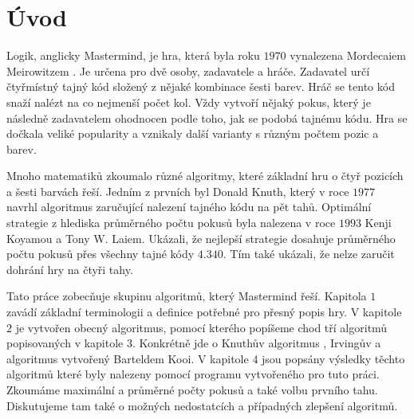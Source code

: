 \chapter*{Úvod}

Logik, anglicky Mastermind, je hra, která byla roku $1970$ vynalezena Mordecaiem Meirowitzem \cite{Nelson-history}. Je určena pro dvě osoby, zadavatele a hráče. Zadavatel určí čtyřmístný tajný kód složený z nějaké kombinace šesti barev. Hráč se tento kód snaží nalézt na co nejmenší počet kol. Vždy vytvoří nějaký pokus, který je následně zadavatelem ohodnocen podle toho, jak se podobá tajnému kódu. Hra se dočkala veliké popularity a vznikaly další varianty s různým počtem pozic a barev. 

Mnoho matematiků zkoumalo různé algoritmy, které základní hru o čtyř pozicích a šesti barvách řeší. Jedním z prvních byl Donald Knuth, který v roce $1977$ navrhl algoritmus zaručující nalezení tajného kódu na pět tahů\cite{donald_e__knuth_1977}. Optimální strategie z hlediska průměrného počtu pokusů byla nalezena v roce $1993$ Kenji Koyamou a Tony W. Laiem. Ukázali, že nejlepší strategie dosahuje průměrného počtu pokusů přes všechny tajné kódy $4.340$. Tím také ukázali, že nelze zaručit dohrání hry na čtyři tahy. 





Tato práce zobecňuje skupinu algoritmů, který Mastermind řeší. Kapitola $1$ zavádí základní terminologii a definice potřebné pro přesný popis hry. V kapitole $2$ je vytvořen obecný algoritmus, pomocí kterého popíšeme chod tří algoritmů popisovaných v kapitole $3$. Konkrétně jde o Knuthův algoritmus \cite{donald_e__knuth_1977}, Irvingův a algoritmus vytvořený Barteldem Kooi. V kapitole $4$ jsou popsány výsledky těchto algoritmů které byly nalezeny pomocí programu vytvořeného pro tuto práci. Zkoumáme maximální a průměrné počty pokusů a také volbu prvního tahu. Diskutujeme tam také o možných nedostatcích a případných zlepšení algoritmů. 